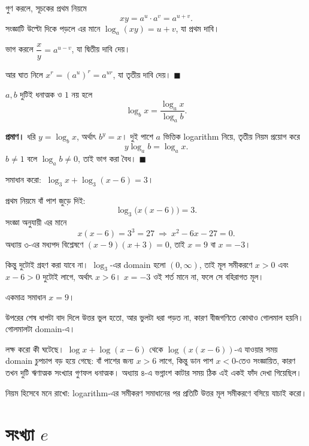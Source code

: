\documentclass[11pt]{article}
\begin{document}
গুণ করলে, সূচকের প্রথম নিয়মে
\[
  xy = a^{u} \cdot a^{v} = a^{u+v} .
\]
সংজ্ঞাটি উল্টো দিকে পড়লে এর মানে $\log_a(xy) = u + v$, যা প্রথম দাবি।

ভাগ করলে $\dfrac{x}{y} = a^{u-v}$, যা দ্বিতীয় দাবি দেয়।

আর ঘাত নিলে $x^{r} = (a^{u})^{r} = a^{ur}$, যা তৃতীয় দাবি দেয়।
$\blacksquare$

\begin{idea}[ভিত্তি পরিবর্তন]
$a, b$ দুটিই ধনাত্মক ও $1$ নয় হলে
\[
  \log_b x = \frac{\log_a x}{\log_a b} .
\]
\end{idea}

\noindent
\textbf{প্রমাণ।} ধরি $y = \log_b x$, অর্থাৎ $b^{y} = x$। দুই পাশে $a$ ভিত্তিক
logarithm নিয়ে, তৃতীয় নিয়ম প্রয়োগ করে
\[
  y \log_a b = \log_a x .
\]
$b \neq 1$ বলে $\log_a b \neq 0$, তাই ভাগ করা বৈধ। $\blacksquare$

\begin{example}
সমাধান করো: $\ \log_3 x + \log_3 (x - 6) = 3$।
\end{example}

\begin{solbox}
প্রথম নিয়মে বাঁ পাশ জুড়ে দিই:
\[
  \log_3 \big( x(x-6) \big) = 3 .
\]
সংজ্ঞা অনুযায়ী এর মানে
\[
  x(x-6) = 3^{3} = 27
  \ \Longrightarrow\ x^{2} - 6x - 27 = 0 .
\]
অধ্যায় ৩-এর মধ্যপদ বিশ্লেষণে $(x-9)(x+3) = 0$, তাই $x = 9$ বা $x = -3$।

কিন্তু দুটোই গ্রহণ করা যাবে না। $\log_3$-এর domain হলো $(0,\infty)$, তাই মূল
সমীকরণে $x > 0$ এবং $x - 6 > 0$ দুটোই লাগে, অর্থাৎ $x > 6$। $x = -3$ ওই শর্ত
মানে না, ফলে সে বহিরাগত মূল।

একমাত্র সমাধান $x = 9$।
\end{solbox}

\begin{remark}
উপরের শেষ ধাপটা বাদ দিলে উত্তর ভুল হতো, আর ভুলটা ধরা পড়ত না, কারণ বীজগণিতে
কোথাও গোলমাল হয়নি। গোলমালটা domain-এ।

লক্ষ করো কী ঘটেছে। $\log x + \log(x-6)$ থেকে $\log(x(x-6))$-এ যাওয়ার সময়
domain চুপচাপ বড় হয়ে গেছে: বাঁ পাশের জন্য $x > 6$ লাগে, কিন্তু ডান পাশ
$x < 0$-তেও সংজ্ঞায়িত, কারণ তখন দুটি ঋণাত্মক সংখ্যার গুণফল ধনাত্মক। অধ্যায়
৪-এ ভগ্নাংশ কাটার সময় ঠিক এই একই ফাঁদ দেখা গিয়েছিল।

নিয়ম হিসেবে মনে রাখো: logarithm-এর সমীকরণ সমাধানের পর প্রতিটি উত্তর মূল
সমীকরণে বসিয়ে যাচাই করো।
\end{remark}

\section{সংখ্যা \texorpdfstring{$e$}{e}}
\end{document}

